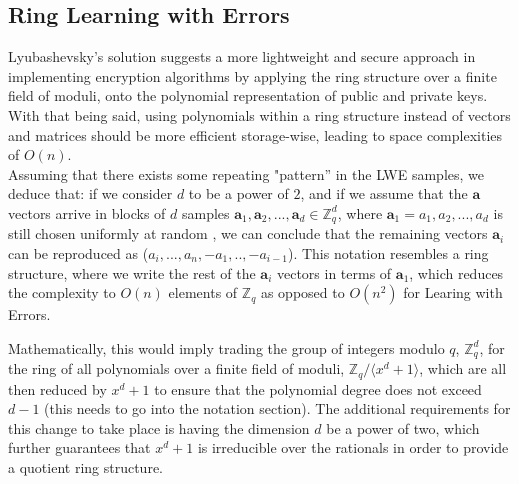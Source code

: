 \documentclass[11pt,
  titlepage=false,
  abstract=on,
]{scrreprt}
\begin{document}
\subsection{Ring Learning with Errors}
Lyubashevsky's solution \cite{lyubashevsky2010ideal} suggests a more lightweight and secure approach in implementing encryption algorithms by applying the ring structure over a finite field of moduli, onto the polynomial representation 
of public and private keys. With that being said, using polynomials within a ring structure instead of vectors and matrices should be more efficient storage-wise, leading to space complexities of $O(n)$.\\

Assuming that there exists some repeating "pattern'' in the LWE samples, we deduce that: if we consider $d$ to be a power of $2$, and if we assume that the $\mathbf{a}$ vectors arrive in blocks of $d$ samples
$\mathbf{a}_1, \mathbf{a}_2,..., \mathbf{a}_d \in \mathbb{Z}^d_q$, where $\mathbf{a}_1 = a_1, a_2,..., a_d$ is still chosen uniformly at random , we can conclude that the remaining vectors $\mathbf{a}_i$
can be reproduced as ($a_i,..., a_n, -a_1,..,-a_{i-1}$). This notation resembles a ring structure, where we write the rest of the $\mathbf{a}_i$ vectors in terms of $\mathbf{a}_1$, which reduces the 
complexity to $O(n)$ elements of $\mathbb{Z}_q$ as opposed to $O(n^2)$ for Learing with Errors.

Mathematically, this would imply trading the group of integers modulo $q$, $\mathbb{Z}^d_q$, for the ring of all polynomials over a finite field of moduli, $\mathbb{Z}_q / \langle x^d + 1\rangle$, which are all then reduced by $x^d + 1$
to ensure that the polynomial degree does not exceed $d-1$ (this needs to go into the notation section).
The additional requirements for this change  to take place is having the dimension $d$ be a power of two, which further guarantees that $x^d + 1$ is irreducible over the rationals in order to provide
a quotient ring structure.
\end{document}
